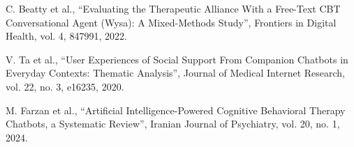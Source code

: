 \documentclass[conference]{IEEEtran}
\begin{document}
\begin{thebibliography}{00}
 C. Beatty et al., ``Evaluating the Therapeutic Alliance With a Free-Text CBT Conversational Agent (Wysa): A Mixed-Methods Study'', Frontiers in Digital Health, vol. 4, 847991, 2022.

 V. Ta et al., ``User Experiences of Social Support From Companion Chatbots in Everyday Contexts: Thematic Analysis'', Journal of Medical Internet Research, vol. 22, no. 3, e16235, 2020.

 M. Farzan et al., ``Artificial Intelligence-Powered Cognitive Behavioral Therapy Chatbots, a Systematic Review'', Iranian Journal of Psychiatry, vol. 20, no. 1, 2024.

\end{thebibliography}
\end{document}
